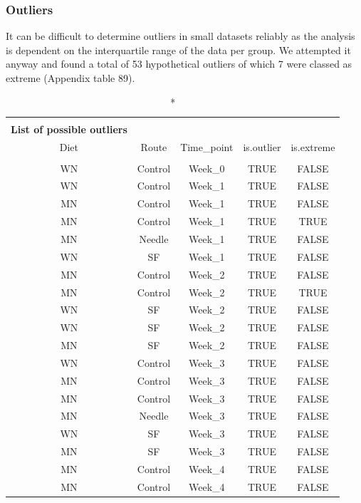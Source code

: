 \documentclass[
  12pt,
  letterpaper,
]{article}
\begin{document}
\subsubsection{Outliers}\label{outliers-2}

It can be difficult to determine outliers in small datasets reliably as the analysis is dependent on the interquartile range of the data per group. We attempted it anyway and found a total of 53 hypothetical outliers of which 7 were classed as extreme (Appendix table 89).

\begingroup
\fontsize{12.0pt}{14.4pt}\selectfont
\begin{longtable}{ccccc}
\caption*{
{\large \textbf{Appendix Table 89}} \\ 
{\small \textbf{List of possible outliers}}
} \\ 
\toprule
{Diet} & {Route} & Time\_point & {is.outlier} & {is.extreme} \\ 
\midrule\addlinespace[2.5pt]
\multicolumn{5}{l}{Pre-Infection} \\[2.5pt] 
\midrule\addlinespace[2.5pt]
WN & Control & Week\_0 & TRUE & FALSE \\ 
WN & Control & Week\_1 & TRUE & FALSE \\ 
MN & Control & Week\_1 & TRUE & FALSE \\ 
MN & Control & Week\_1 & TRUE & TRUE \\ 
MN & Needle & Week\_1 & TRUE & FALSE \\ 
WN & SF & Week\_1 & TRUE & FALSE \\ 
MN & Control & Week\_2 & TRUE & FALSE \\ 
MN & Control & Week\_2 & TRUE & TRUE \\ 
WN & SF & Week\_2 & TRUE & FALSE \\ 
WN & SF & Week\_2 & TRUE & FALSE \\ 
MN & SF & Week\_2 & TRUE & FALSE \\ 
WN & Control & Week\_3 & TRUE & FALSE \\ 
MN & Control & Week\_3 & TRUE & FALSE \\ 
MN & Control & Week\_3 & TRUE & FALSE \\ 
MN & Needle & Week\_3 & TRUE & FALSE \\ 
WN & SF & Week\_3 & TRUE & FALSE \\ 
MN & SF & Week\_3 & TRUE & FALSE \\ 
MN & Control & Week\_4 & TRUE & FALSE \\ 
MN & Control & Week\_4 & TRUE & FALSE \\ 

\end{longtable}
\end{document}
